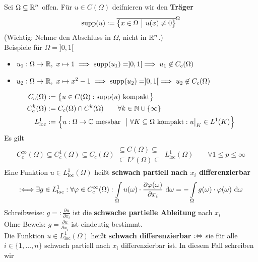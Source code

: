 \begin{beispiel}\enter
Sei $\Omega\subseteq\mathbb{R}^n$ offen. Für $u\in C(\Omega)$ deifnieren wir den \textbf{Träger}
\begin{align*}
\text{supp}(u):=\overline{\big\lbrace x\in\Omega~\big|~u(x)\neq0\big\rbrace}^\Omega
\end{align*}
(Wichtig: Nehme den Abschluss in $\Omega$, nicht in $\mathbb{R}^n$.)\\
Beispiele für $\Omega=]0,1[$
\begin{itemize}
\item $u_1:\Omega\to\mathbb{R},~x\mapsto 1\implies\text{supp}(u_1)=]0,1[\implies u_1\not\in C_c(\Omega)$
\item $u_2:\Omega\to\mathbb{R},~x\mapsto x^2-1\implies\text{supp}(u_2)=]0,1[\implies u_2\not\in C_c(\Omega)$
\end{itemize}
\begin{align*}
C_c(\Omega)&:=\big\lbrace u\in C(\Omega):\text{supp}(u)\text{ kompakt}\big\rbrace\\
C_c^k(\Omega)&:=C_c(\Omega)\cap C^k(\Omega)\qquad\forall k\in\mathbb{N}\cup\lbrace\infty\rbrace\\
L^1_{\text{loc}}&:=\Big\lbrace u:\Omega\to\mathbb{C}\text{ messbar }~\big|~\forall K\subseteq\Omega\text{ kompakt}:u\big|_K\in L^1(K)\Big\rbrace
\end{align*}
Es gilt
\begin{align*}
C_c^\infty(\Omega)\subseteq C^1_c(\Omega)\subseteq C_c(\Omega)\begin{array}{l}
\subseteq C(\Omega)\subseteq\\
\subseteq L^p(\Omega)\subseteq
\end{array} L^1_{\text{loc}}(\Omega)\qquad\forall 1\leq p\leq\infty
\end{align*}
Eine Funktion $u\in L^1_{\text{loc}}(\Omega)$ heißt \textbf{schwach partiell nach $x_i$ differenzierbar}
\begin{align*}
:\Longleftrightarrow\exists g\in L^1_{\text{loc}}:\forall\varphi\in C^\infty_c(\Omega):\int\limits_\Omega u(\omega)\cdot\frac{\partial\varphi(\omega)}{\partial x_i}\text{ d}\omega=-\int\limits_\Omega g(\omega)\cdot\varphi(\omega)\text{ d}\omega
\end{align*}
Schreibweise: $g=:\frac{\partial u}{\partial x_i}$ ist die \textbf{schwache partielle Ableitung} nach $x_i$\\
Ohne Beweis: $g=\frac{\partial u}{\partial x_i}$ ist eindeutig bestimmt.\\
Die Funktion $u\in L^1_{\text{loc}}(\Omega)$ heißt \textbf{schwach differenzierbar} $:\Leftrightarrow$ sie für alle $i\in\lbrace1,\ldots,n\rbrace$ schwach partiell nach $x_i$ differenzierbar ist. In diesem Fall schreiben wir

\end{beispiel}

